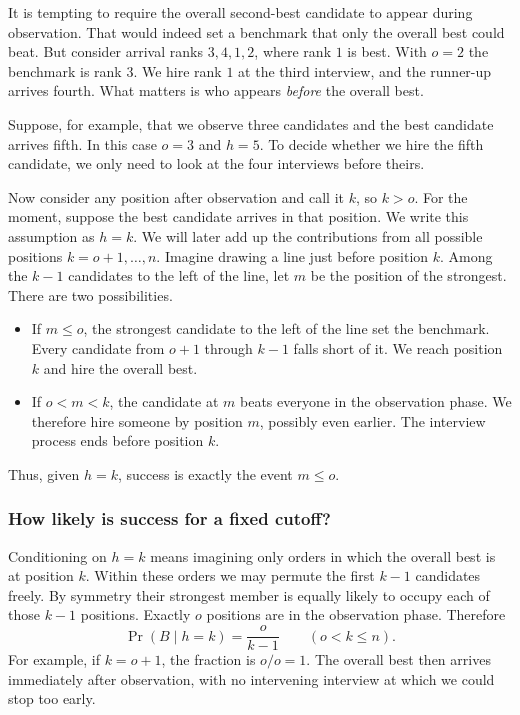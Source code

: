 \documentclass[a4paper,10pt]{article}
\begin{document}
It is tempting to require the overall second-best candidate to appear during
observation. That would indeed set a benchmark that only the overall best
could beat. But consider arrival ranks $3,4,1,2$, where rank $1$ is best.
With $o=2$ the benchmark is rank $3$. We hire rank $1$ at the third interview,
and the runner-up arrives fourth. What matters is who appears \emph{before}
the overall best.

Suppose, for example, that we observe three candidates and the best candidate
arrives fifth. In this case $o=3$ and $h=5$. To decide whether we hire the
fifth candidate, we only need to look at the four interviews before theirs.

Now consider any position after observation and call it $k$, so $k>o$.
For the moment, suppose the best candidate arrives in that position. We write
this assumption as $h=k$. We will later add up the contributions from all
possible positions $k=o+1,\ldots,n$. Imagine drawing a line just before position
$k$. Among the $k-1$ candidates to the left of the line, let $m$ be the
position of the strongest. There are two possibilities.
\begin{itemize}
\item If $m\le o$, the strongest candidate to the left of the line set the
benchmark. Every candidate from $o+1$ through $k-1$ falls short of it.
We reach position $k$ and hire the overall best.
\item If $o<m<k$, the candidate at $m$ beats everyone in the observation
phase. We therefore hire someone by position $m$, possibly even earlier.
The interview process ends before position $k$.
\end{itemize}
Thus, given $h=k$, success is exactly the event $m\le o$.

\subsubsection*{How likely is success for a fixed cutoff?}
Conditioning on $h=k$ means imagining only orders in which the overall best
is at position $k$. Within these orders we may permute the first $k-1$
candidates freely. By symmetry their strongest member is equally likely to
occupy each of those $k-1$ positions. Exactly $o$ positions are in the
observation phase. Therefore
\[
  \Pr(B\mid h=k)=\frac{o}{k-1}\qquad(o<k\le n).
\]
For example, if $k=o+1$, the fraction is $o/o=1$. The overall best then
arrives immediately after observation, with no intervening interview at
which we could stop too early.
\end{document}
